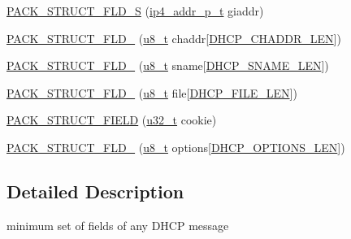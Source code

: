 \begin{DoxyCompactItemize}
\item 
\hyperlink{structdhcp__msg_a26c28cde7f50c104ff1615fc35a38203}{P\+A\+C\+K\+\_\+\+S\+T\+R\+U\+C\+T\+\_\+\+F\+L\+D\+\_\+S} (\hyperlink{native_2lwip_2src_2include_2lwip_2prot_2ip4_8h_ae5011654fcbadf6b6582b8d49446107f}{ip4\+\_\+addr\+\_\+p\+\_\+t} giaddr)
\item 
\hyperlink{structdhcp__msg_a8247405cf81cc7e34a47cc75900a98d9}{P\+A\+C\+K\+\_\+\+S\+T\+R\+U\+C\+T\+\_\+\+F\+L\+D\+\_} (\hyperlink{group__compiler__abstraction_ga4caecabca98b43919dd11be1c0d4cd8e}{u8\+\_\+t} chaddr\mbox{[}\hyperlink{openmote-cc2538_2lwip_2src_2include_2lwip_2prot_2dhcp_8h_a15b8e74ffbf5eb908da440c307401c04}{D\+H\+C\+P\+\_\+\+C\+H\+A\+D\+D\+R\+\_\+\+L\+EN}\mbox{]})
\item 
\hyperlink{structdhcp__msg_ac79313a1aa24916d8600d65046ebe352}{P\+A\+C\+K\+\_\+\+S\+T\+R\+U\+C\+T\+\_\+\+F\+L\+D\+\_} (\hyperlink{group__compiler__abstraction_ga4caecabca98b43919dd11be1c0d4cd8e}{u8\+\_\+t} sname\mbox{[}\hyperlink{openmote-cc2538_2lwip_2src_2include_2lwip_2prot_2dhcp_8h_a4227e9baee8b09567d1d9dda9d8a8cf3}{D\+H\+C\+P\+\_\+\+S\+N\+A\+M\+E\+\_\+\+L\+EN}\mbox{]})
\item 
\hyperlink{structdhcp__msg_a092a5c676c9e73286d81ebc583e8a348}{P\+A\+C\+K\+\_\+\+S\+T\+R\+U\+C\+T\+\_\+\+F\+L\+D\+\_} (\hyperlink{group__compiler__abstraction_ga4caecabca98b43919dd11be1c0d4cd8e}{u8\+\_\+t} file\mbox{[}\hyperlink{openmote-cc2538_2lwip_2src_2include_2lwip_2prot_2dhcp_8h_a4ffd004c5d53666e9315d9571af6d41b}{D\+H\+C\+P\+\_\+\+F\+I\+L\+E\+\_\+\+L\+EN}\mbox{]})
\item 
\hyperlink{structdhcp__msg_a579f758f76b1b5b1b26718f7798d5cc8}{P\+A\+C\+K\+\_\+\+S\+T\+R\+U\+C\+T\+\_\+\+F\+I\+E\+LD} (\hyperlink{group__compiler__abstraction_ga4c14294869aceba3ef9d4c0c302d0f33}{u32\+\_\+t} cookie)
\item 
\hyperlink{structdhcp__msg_a5c611e9424152b509cf171af66362d66}{P\+A\+C\+K\+\_\+\+S\+T\+R\+U\+C\+T\+\_\+\+F\+L\+D\+\_} (\hyperlink{group__compiler__abstraction_ga4caecabca98b43919dd11be1c0d4cd8e}{u8\+\_\+t} options\mbox{[}\hyperlink{openmote-cc2538_2lwip_2src_2include_2lwip_2prot_2dhcp_8h_ae99d4be0d03f6f9c8f02f63abde91a06}{D\+H\+C\+P\+\_\+\+O\+P\+T\+I\+O\+N\+S\+\_\+\+L\+EN}\mbox{]})
\end{DoxyCompactItemize}


\subsection{Detailed Description}
minimum set of fields of any D\+H\+CP message 

